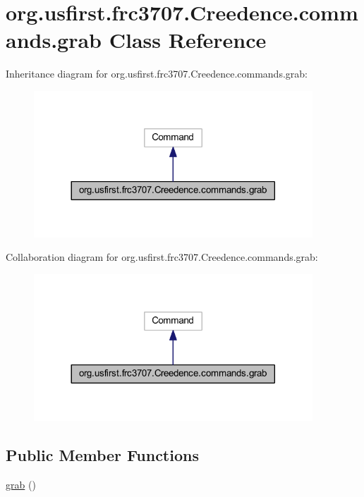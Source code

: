 \hypertarget{classorg_1_1usfirst_1_1frc3707_1_1_creedence_1_1commands_1_1grab}{}\section{org.\+usfirst.\+frc3707.\+Creedence.\+commands.\+grab Class Reference}
\label{classorg_1_1usfirst_1_1frc3707_1_1_creedence_1_1commands_1_1grab}


Inheritance diagram for org.\+usfirst.\+frc3707.\+Creedence.\+commands.\+grab\+:
\nopagebreak
\begin{figure}[H]
\begin{center}
\leavevmode
\includegraphics[width=296pt]{classorg_1_1usfirst_1_1frc3707_1_1_creedence_1_1commands_1_1grab__inherit__graph}
\end{center}
\end{figure}


Collaboration diagram for org.\+usfirst.\+frc3707.\+Creedence.\+commands.\+grab\+:
\nopagebreak
\begin{figure}[H]
\begin{center}
\leavevmode
\includegraphics[width=296pt]{classorg_1_1usfirst_1_1frc3707_1_1_creedence_1_1commands_1_1grab__coll__graph}
\end{center}
\end{figure}
\subsection*{Public Member Functions}
\begin{DoxyCompactItemize}
\item 
\mbox{\hyperlink{classorg_1_1usfirst_1_1frc3707_1_1_creedence_1_1commands_1_1grab_ae8ee53243918011d49f2578bdaaf0fcb}{grab}} ()
\end{DoxyCompactItemize}
